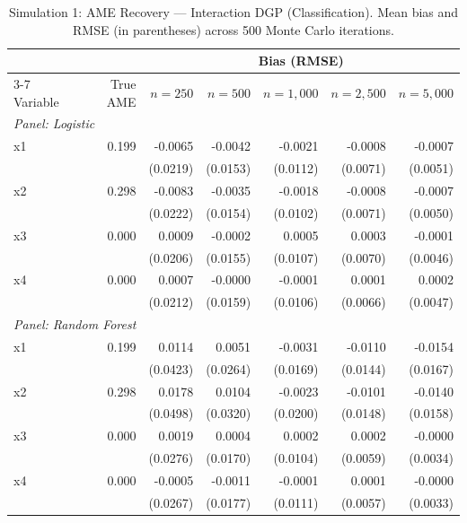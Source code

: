 \documentclass[12pt]{article}
\begin{document}
	\begin{table}[htbp]
		\centering
		\small
		\begin{threeparttable}
			\caption{Simulation 1: AME Recovery --- Interaction DGP (Classification). Mean bias and RMSE (in parentheses) across 500 Monte Carlo iterations.}
			\label{tab:sim1_classification_interaction}
			\begin{tabular}{lrrrrrr}
				\toprule
				& & \multicolumn{5}{c}{Bias (RMSE)} \\
				\cmidrule(lr){3-7}
				Variable & True AME & $n=250$ & $n=500$ & $n=1,000$ & $n=2,500$ & $n=5,000$ \\
				\midrule
				\multicolumn{7}{l}{\textit{Panel: Logistic}} \\
				\quad x1 & 0.199 & -0.0065 & -0.0042 & -0.0021 & -0.0008 & -0.0007 \\
				&  & (0.0219) & (0.0153) & (0.0112) & (0.0071) & (0.0051) \\
				\quad x2 & 0.298 & -0.0083 & -0.0035 & -0.0018 & -0.0008 & -0.0007 \\
				&  & (0.0222) & (0.0154) & (0.0102) & (0.0071) & (0.0050) \\
				\quad x3 & 0.000 & 0.0009 & -0.0002 & 0.0005 & 0.0003 & -0.0001 \\
				&  & (0.0206) & (0.0155) & (0.0107) & (0.0070) & (0.0046) \\
				\quad x4 & 0.000 & 0.0007 & -0.0000 & -0.0001 & 0.0001 & 0.0002 \\
				&  & (0.0212) & (0.0159) & (0.0106) & (0.0066) & (0.0047) \\
				\midrule
				\multicolumn{7}{l}{\textit{Panel: Random Forest}} \\
				\quad x1 & 0.199 & 0.0114 & 0.0051 & -0.0031 & -0.0110 & -0.0154 \\
				&  & (0.0423) & (0.0264) & (0.0169) & (0.0144) & (0.0167) \\
				\quad x2 & 0.298 & 0.0178 & 0.0104 & -0.0023 & -0.0101 & -0.0140 \\
				&  & (0.0498) & (0.0320) & (0.0200) & (0.0148) & (0.0158) \\
				\quad x3 & 0.000 & 0.0019 & 0.0004 & 0.0002 & 0.0002 & -0.0000 \\
				&  & (0.0276) & (0.0170) & (0.0104) & (0.0059) & (0.0034) \\
				\quad x4 & 0.000 & -0.0005 & -0.0011 & -0.0001 & 0.0001 & -0.0000 \\
				&  & (0.0267) & (0.0177) & (0.0111) & (0.0057) & (0.0033) \\

\end{tabular}
\end{threeparttable}
\end{table}
\end{document}
